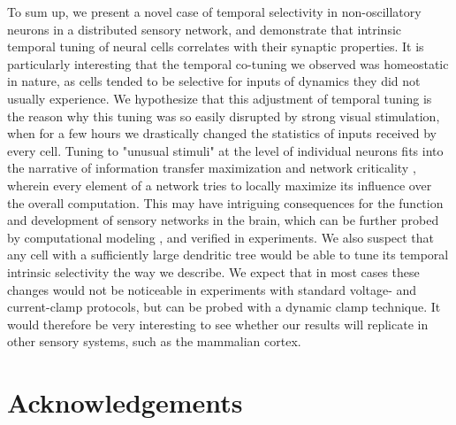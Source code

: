 \documentclass{article}
\begin{document}

To sum up, we present a novel case of temporal selectivity in non-oscillatory neurons in a distributed sensory network, and demonstrate that intrinsic temporal tuning of neural cells correlates with their synaptic properties. It is particularly interesting that the temporal co-tuning we observed was homeostatic in nature, as cells tended to be selective for inputs of dynamics they did not usually experience. We hypothesize that this adjustment of temporal tuning is the reason why this tuning was so easily disrupted by strong visual stimulation, when for a few hours we drastically changed the statistics of inputs received by every cell. Tuning to "unusual stimuli" at the level of individual neurons fits into the narrative of information transfer maximization \citep{brenner2000} and network criticality \citep{rubinov2011}, wherein every element of a network tries to locally maximize its influence over the overall computation. This may have intriguing consequences for the function and development of sensory networks in the brain, which can be further probed by computational modeling \citep{khakhalin2014,jang2016}, and verified in experiments. We also suspect that any cell with a sufficiently large dendritic tree would be able to tune its temporal intrinsic selectivity the way we describe. We expect that in most cases these changes would not be noticeable in experiments with standard voltage- and current-clamp protocols, but can be probed with a dynamic clamp technique. It would therefore be very interesting to see whether our results will replicate in other sensory systems, such as the mammalian cortex.


\section*{Acknowledgements}
\end{document}
